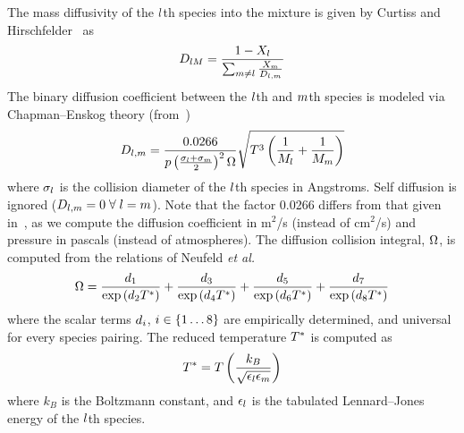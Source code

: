 The mass diffusivity of the $l$th species into the mixture is given by Curtiss and Hirschfelder~\cite{Curtiss1949} as
%
\begin{equation}\label{eq:curtissAvgDiff}
	D_{l M} = \frac{1 - X_{l}}{\sum_{m \neq l} \frac{X_{m}}{D_{l, m}}}
\end{equation}
%
The binary diffusion coefficient between the $l$th and $m$th species is modeled via Chapman--Enskog theory (from~\cite{propGasLiquid})
%
\begin{equation}
	D_{l, m} = \frac{0.0266}{p \left(\frac{\sigma_{l} + \sigma_{m}}{2}\right)^2 \Omega} \sqrt{T^3 \left(\frac{1}{M_{l}} + \frac{1}{M_{m}}\right)}
\end{equation}
%
where $\sigma_{l}$ is the collision diameter of the $l$th species in Angstroms. Self diffusion is ignored ($D_{l, m} = 0 \; \forall \; l = m$). Note that the factor 0.0266 differs from that given in~\cite{propGasLiquid}, as we compute the diffusion coefficient in m$^2$/s (instead of cm$^2$/s) and pressure in pascals (instead of atmospheres). The diffusion collision integral, $\Omega$, is computed from the relations of Neufeld \textit{et al.}~\cite{Neufeld1972}
%
\begin{equation}
	\Omega = \frac{d_{1}}{\text{exp} \left(d_{2} T^*\right)} + \frac{d_{3}}{\text{exp} \left(d_{4} T^*\right)} + \frac{d_{5}}{\text{exp} \left(d_{6} T^*\right)} + \frac{d_{7}}{\text{exp} \left(d_{8} T^*\right)}
\end{equation}
%
where the scalar terms $d_{i}$, $i \in \{1 \hdots 8\}$ are empirically determined, and universal for every species pairing. The reduced temperature $T^*$ is computed as
\begin{equation}
	T^* = T \left( \frac{k_B}{\sqrt{\epsilon_{l} \epsilon_{m}}} \right)
\end{equation}
where $k_B$ is the Boltzmann constant, and $\epsilon_{l}$ is the tabulated Lennard--Jones energy of the $l$th species.

